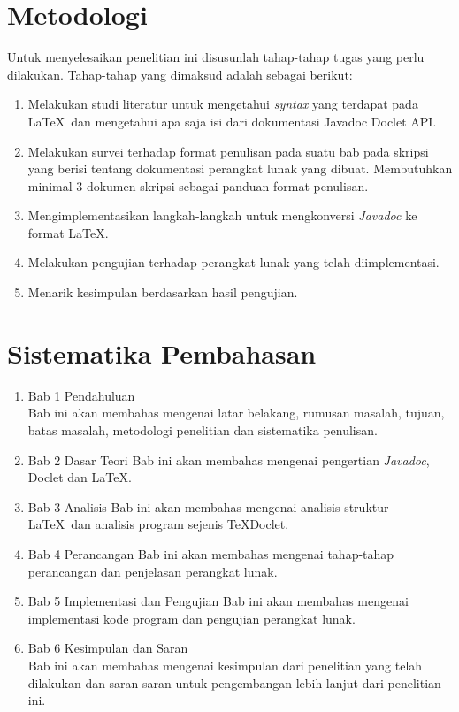 \section{Metodologi}
\label{sec:metlit}
Untuk menyelesaikan penelitian ini disusunlah tahap-tahap tugas yang perlu dilakukan. Tahap-tahap yang dimaksud adalah sebagai berikut:
\begin{enumerate}
	\item Melakukan studi literatur untuk mengetahui {\it syntax} yang terdapat pada \LaTeX\ dan mengetahui apa saja isi dari dokumentasi Javadoc Doclet API.
	\item Melakukan survei terhadap format penulisan pada suatu bab pada skripsi yang berisi tentang dokumentasi perangkat lunak yang dibuat. Membutuhkan minimal 3 dokumen skripsi sebagai panduan format penulisan.
	\item Mengimplementasikan langkah-langkah untuk mengkonversi {\it Javadoc} ke format \LaTeX.
	\item Melakukan pengujian terhadap perangkat lunak yang telah diimplementasi.
	\item Menarik kesimpulan berdasarkan hasil pengujian.
\end{enumerate}

\section{Sistematika Pembahasan}
\label{sec:sispem}
\begin{enumerate}
	\item Bab 1 Pendahuluan\\
	Bab ini akan membahas mengenai latar belakang, rumusan masalah, tujuan, batas masalah, metodologi penelitian dan sistematika penulisan.
	\item Bab 2 Dasar Teori
	Bab ini akan membahas mengenai pengertian {\it Javadoc}, Doclet dan \LaTeX.
	\item Bab 3 Analisis
	Bab ini akan membahas mengenai analisis struktur \LaTeX\ dan analisis program sejenis TeXDoclet.
	\item Bab 4 Perancangan
	Bab ini akan membahas mengenai tahap-tahap perancangan dan penjelasan perangkat lunak.
	\item Bab 5 Implementasi dan Pengujian
	Bab ini akan membahas mengenai implementasi kode program dan pengujian perangkat lunak.
	\item Bab 6 Kesimpulan dan Saran\\
	Bab ini akan membahas mengenai kesimpulan dari penelitian yang telah dilakukan dan saran-saran untuk pengembangan lebih lanjut dari penelitian ini.
\end{enumerate}
















